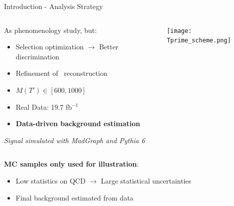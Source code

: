\begin{frame}{Introduction - Analysis Strategy}
\vspace{-.5cm}
\begin{columns}

\begin{column}{.40\textwidth}
\begin{block}{}
\scriptsize{
As phenomenology study, but:
  \begin{itemize}
  \item Selection optimization $\to$ Better discrimination
  \item Refinement of \Tp~reconstruction
  \item $M(T')\in [600,1000]$ \GeVcc
  \item Real Data: 19.7 fb$^{-1}$
  \item \textbf{Data-driven background estimation}
  \end{itemize}
}
\tiny{
\textit{Signal simulated with MadGraph and Pythia 6}
}
\end{block}
\end{column}

\begin{column}{.60\textwidth}
  \begin{center}
    \texttt{[image: Tprime\_scheme.png]}\\
  \end{center}
\vspace{-.2cm}
\end{column}
\end{columns}

\vspace{-.1cm}
\begin{block}{}\scriptsize
\textbf{MC samples only used for illustration}:
\begin{itemize}
\item Low statistics on QCD $\to$ Large statistical uncertainties 
\item Final background estimated from data
\end{itemize}
\end{block}

\end{frame}

